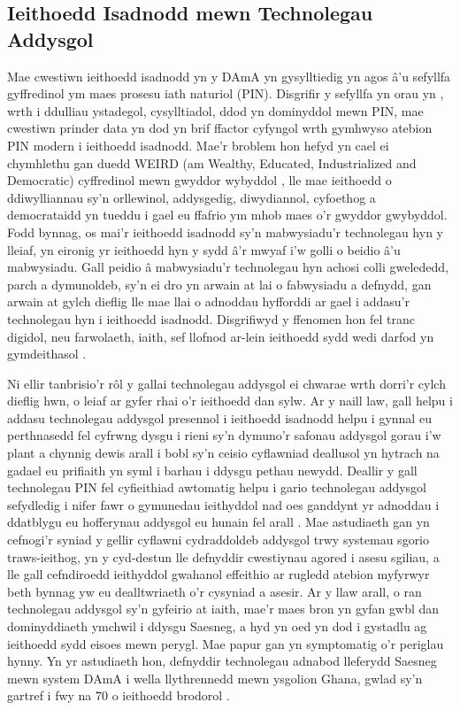     \subsection{Ieithoedd Isadnodd mewn Technolegau Addysgol}
Mae cwestiwn ieithoedd isadnodd yn y DAmA yn gysylltiedig yn agos â'u sefyllfa gyffredinol ym maes prosesu iath naturiol (PIN). Disgrifir y sefyllfa yn orau yn \textcite{magueresse_low-resource_2020}, wrth i ddulliau ystadegol, cysylltiadol, ddod yn dominyddol mewn PIN, mae cwestiwn prinder data yn dod yn brif ffactor cyfyngol wrth gymhwyso atebion PIN modern i ieithoedd isadnodd. Mae'r broblem hon hefyd yn cael ei chymhlethu gan duedd WEIRD (am Wealthy, Educated, Industrialized and Democratic) cyffredinol mewn gwyddor wybyddol \parencite{henrich_most_2010}, lle mae ieithoedd o ddiwylliannau sy'n orllewinol, addysgedig, diwydiannol, cyfoethog a democrataidd yn tueddu i gael eu ffafrio ym mhob maes o'r gwyddor gwybyddol. Fodd bynnag, os mai'r ieithoedd isadnodd sy'n mabwysiadu'r technolegau hyn y lleiaf, yn eironig yr ieithoedd hyn y sydd â'r mwyaf i'w golli o beidio â'u mabwysiadu. Gall peidio â mabwysiadu'r technolegau hyn achosi colli gwelededd, parch a dymunoldeb, sy'n ei dro yn arwain at lai o fabwysiadu a defnydd, gan arwain at gylch dieflig lle mae llai o adnoddau hyfforddi ar gael i addasu'r technolegau hyn i ieithoedd isadnodd. Disgrifiwyd y ffenomen hon fel tranc digidol, neu farwolaeth, iaith, sef llofnod ar-lein ieithoedd sydd wedi darfod yn gymdeithasol \parencite{kornai_digital_2013}.

Ni ellir tanbrisio'r rôl y gallai technolegau addysgol ei chwarae wrth dorri'r cylch dieflig hwn, o leiaf ar gyfer rhai o'r ieithoedd dan sylw. Ar y naill law, gall helpu i addasu technolegau addysgol presennol i ieithoedd isadnodd helpu i gynnal eu perthnasedd fel cyfrwng dysgu i rieni sy'n dymuno'r safonau addysgol gorau i'w plant a chynnig dewis arall i bobl sy'n ceisio cyflawniad deallusol yn hytrach na gadael eu prifiaith yn syml i barhau i ddysgu pethau newydd. Deallir y gall technolegau PIN fel cyfieithiad awtomatig helpu i gario technolegau addysgol sefydledig i nifer fawr o gymunedau ieithyddol nad oes ganddynt yr adnoddau i ddatblygu eu hofferynau addysgol eu hunain fel arall \parencite{haddow_survey_2022}. Mae astudiaeth gan \textcite{horbach_crosslingual_2024} yn cefnogi'r syniad y gellir cyflawni cydraddoldeb addysgol trwy systemau sgorio traws-ieithog, yn y cyd-destun lle defnyddir cwestiynau agored i asesu sgiliau, a lle gall cefndiroedd ieithyddol gwahanol effeithio ar rugledd atebion myfyrwyr beth bynnag yw eu dealltwriaeth o'r cysyniad a asesir. Ar y llaw arall, o ran technolegau addysgol sy'n gyfeirio at iaith, mae'r maes bron yn gyfan gwbl dan dominyddiaeth ymchwil i ddysgu Saesneg, a hyd yn oed yn dod i gystadlu ag ieithoedd sydd eisoes mewn perygl. Mae papur gan \textcite{henkel_supporting_2025} yn symptomatig o'r periglau hynny. Yn yr astudiaeth hon, defnyddir technolegau adnabod lleferydd Saesneg mewn system DAmA i wella llythrennedd mewn ysgolion Ghana, gwlad sy'n gartref i fwy na 70 o ieithoedd brodorol \parencite{noauthor_ghana_nodate}.

